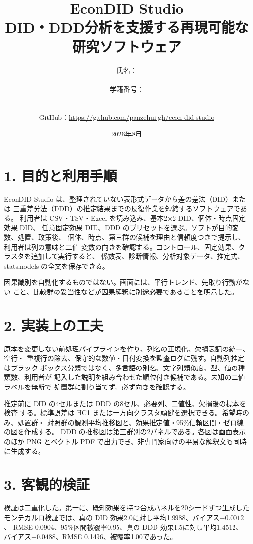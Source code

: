 \documentclass[xelatex,ja=standard,a4paper,9pt]{bxjsarticle}
\title{\vspace{-12mm}\textbf{EconDID Studio}\\[-1mm]
\large DID・DDD分析を支援する再現可能な研究ソフトウェア}
\author{氏名：\rule{32mm}{0.4pt}\quad 学籍番号：\rule{28mm}{0.4pt}\\
GitHub：\url{https://github.com/panzehui-gh/econ-did-studio}}
\date{2026年8月}
\begin{document}
\maketitle
\vspace{-6mm}

\section*{1. 目的と利用手順}
EconDID Studio は、整理されていない表形式データから差の差法（DID）または
三重差分法（DDD）の推定結果までの反復作業を短縮するソフトウェアである。
利用者は CSV・TSV・Excel を読み込み、基本2×2 DID、個体・時点固定効果 DID、
任意固定効果 DID、DDD のプリセットを選ぶ。ソフトが目的変数、処置、政策後、
個体、時点、第三群の候補を理由と信頼度つきで提示し、利用者は列の意味と二値
変数の向きを確認する。コントロール、固定効果、クラスタを追加して実行すると、
係数表、診断情報、分析対象データ、推定式、statsmodels の全文を保存できる。

因果識別を自動化するものではない。画面には、平行トレンド、先取り行動がない
こと、比較群の妥当性などが因果解釈に別途必要であることを明示した。

\section*{2. 実装上の工夫}
原本を変更しない前処理パイプラインを作り、列名の正規化、欠損表記の統一、空行・
重複行の除去、保守的な数値・日付変換を監査ログに残す。自動列推定はブラック
ボックス分類ではなく、多言語の別名、文字列類似度、型、値の種類数、利用者が
記入した説明を組み合わせた順位付き候補である。未知の二値ラベルを無断で
処置群に割り当てず、必ず向きを確認する。

推定前に DID の4セルまたは DDD の8セル、必要列、二値性、欠損後の標本を検査
する。標準誤差は HC1 または一方向クラスタ頑健を選択できる。希望時のみ、処置群・
対照群の観測平均推移図と、効果推定値・95\%信頼区間・ゼロ線の図を作成する。
DDD の推移図は第三群別の2パネルである。各図は画面表示のほか PNG とベクトル
PDF で出力でき、非専門家向けの平易な解釈文も同時に生成する。

\section*{3. 客観的検証}
検証は二重化した。第一に、既知効果を持つ合成パネルを20シードずつ生成した
モンテカルロ検証では、真の DID 効果2.0に対し平均1.9988、バイアス$-0.0012$、
RMSE 0.0904、95\%区間被覆率0.95、真の DDD 効果1.5に対し平均1.4512、
バイアス$-0.0488$、RMSE 0.1496、被覆率1.00であった。
\end{document}
